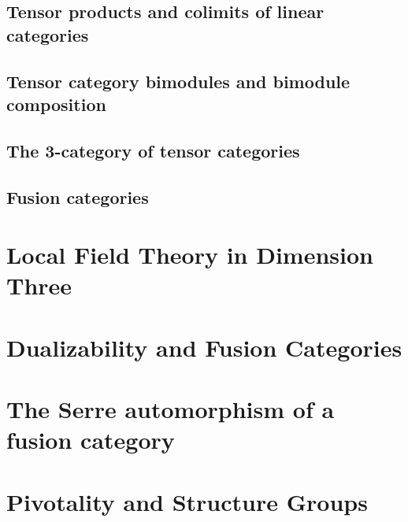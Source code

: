 \documentclass{amsart}
\begin{document}
\subsection{Tensor products and colimits of linear categories}
\subsection{Tensor category bimodules and bimodule composition}
\subsection{The 3-category of tensor categories}
\subsection{Fusion categories}



\section{Local Field Theory in Dimension Three}

%
%

\section{Dualizability and Fusion Categories}


\section{The Serre automorphism of a fusion category}

%

\section{Pivotality and Structure Groups}
\end{document}
